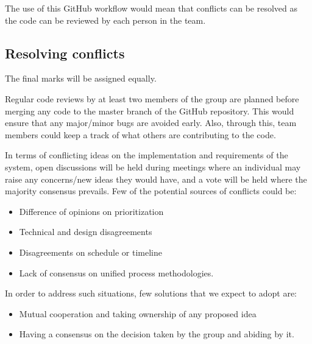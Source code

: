 \documentclass[11pt,a4paper]{article}
\begin{document}
The use of this GitHub workflow would mean that conflicts can be resolved as the code can be reviewed by each person in the team. 

\subsection{Resolving conflicts}

The final marks will be assigned equally.

Regular code reviews by at least two members of the group are planned before merging any code to the master branch of the GitHub repository. This would ensure that any major/minor bugs are avoided early. Also, through this, team members could keep a track of what others are contributing to the code.

In terms of conflicting ideas on the implementation and requirements of the system, open discussions will be held during meetings where an individual may raise any concerns/new ideas they would have, and a vote will be held where the majority consensus prevails.
Few of the potential sources of conflicts could be:
\begin{itemize}
\item Difference of opinions on prioritization
\item Technical and design disagreements
\item Disagreements on schedule or timeline
\item Lack of consensus on unified process methodologies.
\end{itemize}
In order to address such situations, few solutions that we expect to adopt are:
\begin{itemize}
\item Mutual cooperation and taking ownership of any proposed idea
\item Having a consensus on the decision taken by the group and abiding by it.
\end{itemize}








%
%
%
%
\end{document}
